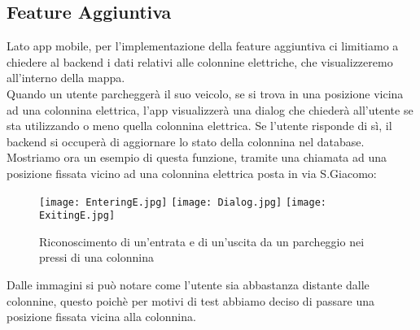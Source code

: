 \documentclass[../../Report.tex]{subfiles}
\begin{document}
\subsection{Feature Aggiuntiva}
Lato app mobile, per l'implementazione della feature aggiuntiva ci limitiamo a chiedere al backend i dati relativi alle colonnine elettriche, che visualizzeremo all'interno della mappa.\\ 
Quando un utente parcheggerà il suo veicolo, se si trova in una posizione vicina ad una colonnina elettrica, l'app visualizzerà una dialog che chiederà all'utente se sta utilizzando o meno quella colonnina elettrica. Se l'utente risponde di sì, il backend si occuperà di aggiornare lo stato della colonnina nel database.\\
Mostriamo ora un esempio di questa funzione, tramite una chiamata ad una posizione fissata vicino ad una colonnina elettrica posta in via S.Giacomo: 
\begin{figure}[H]
  \centering
  \texttt{[image: EnteringE.jpg]}
  \texttt{[image: Dialog.jpg]}
  \texttt{[image: ExitingE.jpg]}

  \caption{Riconoscimento di un'entrata e di un'uscita da un parcheggio nei pressi di una colonnina}
\end{figure}
Dalle immagini si può notare come l'utente sia abbastanza distante dalle colonnine, questo poichè per motivi di test abbiamo deciso di passare una posizione fissata vicina alla colonnina. 
\end{document}
